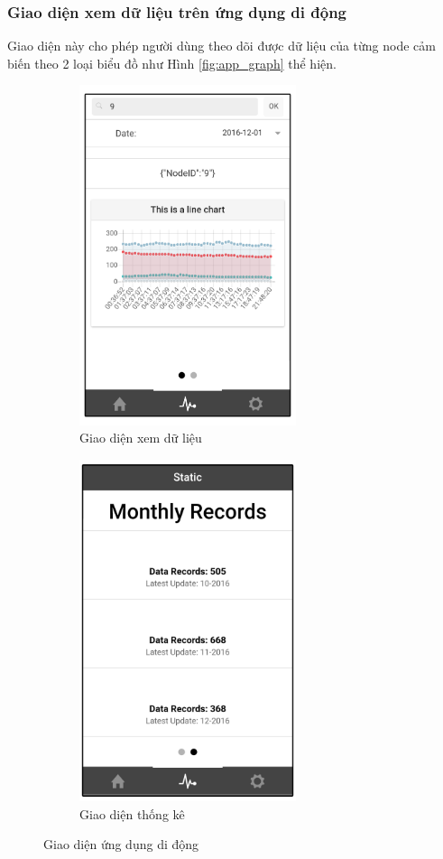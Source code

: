 \subsubsection*{Giao diện xem dữ liệu trên ứng dụng di động}
Giao diện này cho phép người dùng theo dõi được dữ liệu của từng node cảm biến theo 2 loại biểu đồ như Hình \ref{fig:app_graph} thể hiện.
\begin{figure}[H]
	\centering  
	\begin{subfigure}[b]{0.5\textwidth}
		\includegraphics[width=2.5in]{main_4}
		\caption[Giao diện xem dữ liệu]{Giao diện xem dữ liệu}
		\label{fig:main_4}
	\end{subfigure}\hfill
	\begin{subfigure}[b]{0.5\textwidth}
		\includegraphics[width=2.5in]{main_3}
		\caption[Giao diện thống kê]{Giao diện thống kê}
		\label{fig:main_3}
	\end{subfigure}
	\caption{Giao diện ứng dụng di động}\label{fig:giaodienchinh2}
\end{figure}
\newpage
